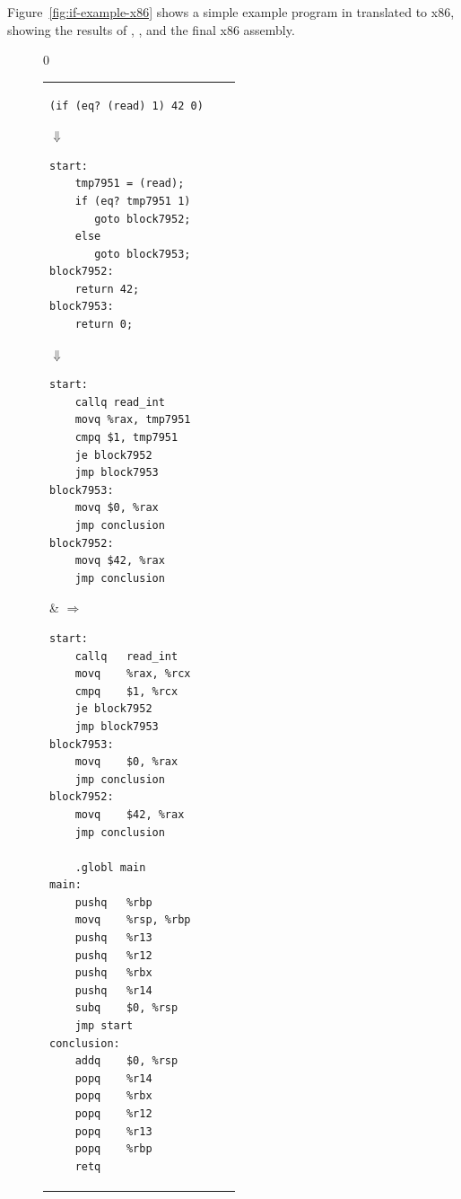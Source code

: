 \documentclass[7x10]{TimesAPriori_MIT}%
\def\racketEd{0}
\def\edition{0}
\numberwithin{theorem}{chapter}
\numberwithin{definition}{chapter}
\numberwithin{equation}{chapter}
\begin{document}
Figure~\ref{fig:if-example-x86} shows a simple example program in
\LangIf{} translated to x86, showing the results of
, , and the final
x86 assembly.

\begin{figure}[tbp]
  \begin{tcolorbox}[colback=white]
    {\if\edition\racketEd
\begin{tabular}{lll}
\begin{minipage}{0.4\textwidth}
\begin{lstlisting}
(if (eq? (read) 1) 42 0)
\end{lstlisting}
$\Downarrow$
\begin{lstlisting}
start:
    tmp7951 = (read);
    if (eq? tmp7951 1)
       goto block7952;
    else
       goto block7953;
block7952:
    return 42;
block7953:
    return 0;
\end{lstlisting}
$\Downarrow$
\begin{lstlisting}
start:
    callq read_int
    movq %rax, tmp7951
    cmpq $1, tmp7951
    je block7952
    jmp block7953
block7953:
    movq $0, %rax
    jmp conclusion
block7952:
    movq $42, %rax
    jmp conclusion
\end{lstlisting}
\end{minipage}
&
$\Rightarrow\qquad$
\begin{minipage}{0.4\textwidth}
\begin{lstlisting}
start:
	callq	read_int
	movq	%rax, %rcx
	cmpq	$1, %rcx
	je block7952
	jmp block7953
block7953:
	movq	$0, %rax
	jmp conclusion
block7952:
	movq	$42, %rax
	jmp conclusion

	.globl main
main:
	pushq	%rbp
	movq	%rsp, %rbp
	pushq	%r13
	pushq	%r12
	pushq	%rbx
	pushq	%r14
	subq	$0, %rsp
	jmp start
conclusion:
	addq	$0, %rsp
	popq	%r14
	popq	%rbx
	popq	%r12
	popq	%r13
	popq	%rbp
	retq
\end{lstlisting}
\end{minipage}
\end{tabular}
\fi}


\end{tcolorbox}
\end{figure}
\end{document}
